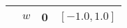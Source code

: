 \begin{table}[t]
\begin{tabular}{c|cc|cc}
                          & $w$             & 0       & \multicolumn{2}{c}{$[-1.0, 1.0]$}                                                                                                       \\ \bottomrule
\end{tabular}
\end{table}
